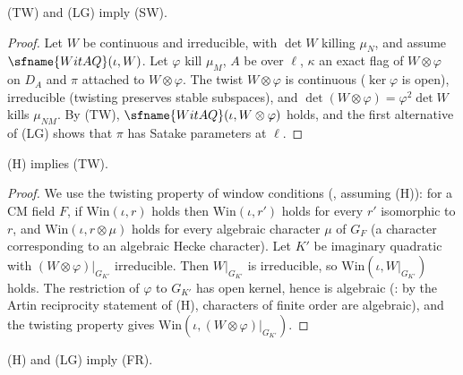 \begin{theorem}\label{pf:kato:sphofwit}
\textup{(TW)} and \textup{(LG)} imply \textup{(SW)}.
\end{theorem}

\begin{proof}
Let $W$ be continuous and irreducible, with $\det W$ killing $\mu_N$, and assume $\sfname{WitAQ}(\iota,W)$. Let
$\varphi$ kill $\mu_M$, $A$ be over $\ell$, $\kappa$ an exact flag of $W\otimes\varphi$ on $D_A$ and $\pi$ attached to
$W\otimes\varphi$. The twist $W\otimes\varphi$ is continuous ($\ker\varphi$ is open), irreducible (twisting preserves stable
subspaces), and $\det(W\otimes\varphi)=\varphi^2\det W$ kills $\mu_{NM}$. By \textup{(TW)},
$\sfname{WitAQ}(\iota,W\otimes\varphi)$ holds, and the first alternative of \textup{(LG)} shows that $\pi$ has
Satake parameters at $\ell$.
\end{proof}

\begin{theorem}\label{pf:kato:twwit}
\textup{(H)} implies \textup{(TW)}.
\end{theorem}

\begin{proof}
We use the twisting property of window conditions (, assuming
\textup{(H)}): for a CM field $F$, if $\mathrm{Win}(\iota,r)$ holds then $\mathrm{Win}(\iota,r')$ holds for every $r'$
isomorphic to $r$, and $\mathrm{Win}(\iota,r\otimes\mu)$ holds for every algebraic character $\mu$ of $G_F$ (a character
corresponding to an algebraic Hecke character). Let $K'$ be imaginary quadratic with $(W\otimes\varphi)|_{G_{K'}}$
irreducible. Then $W|_{G_{K'}}$ is irreducible, so $\mathrm{Win}(\iota,W|_{G_{K'}})$ holds. The restriction of $\varphi$ to
$G_{K'}$ has open kernel, hence is algebraic (: by the
Artin reciprocity statement of \textup{(H)}, characters of finite order are algebraic), and the twisting property gives
$\mathrm{Win}(\iota,(W\otimes\varphi)|_{G_{K'}})$.
\end{proof}

\begin{theorem}\label{pf:kato:frobroot}
\textup{(H)} and \textup{(LG)} imply \textup{(FR)}.
\end{theorem}

